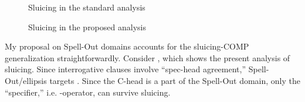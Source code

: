 \documentclass[output=paper]{langscibook}
\begin{document}
\begin{figure}
\begin{floatrow}
\captionsetup{margin=.05\linewidth}

{\caption{Sluicing in the standard analysis\label{aranostructure sluice}}}
        {\caption{Sluicing in the proposed analysis\label{aranomy structure sluice}}}
\end{floatrow}
\end{figure}

My proposal on Spell-Out domains accounts for the sluicing-COMP generalization straightforwardly. Consider , which shows the present analysis of sluicing. Since interrogative clauses involve ``spec-head agreement,'' Spell-Out/ellipsis targets . Since the C-head is a part of the Spell-Out domain, only the ``specifier,'' i.e. \wh-operator, can survive sluicing. 
\end{document}
